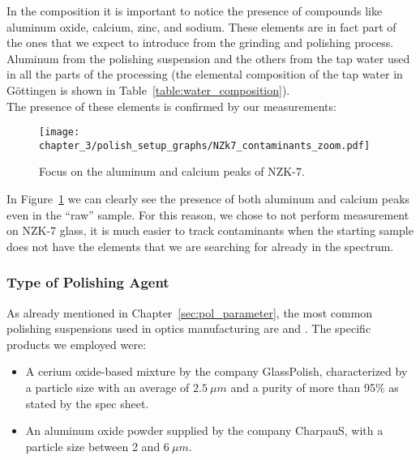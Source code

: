 In the composition it is important to notice the presence of compounds like aluminum oxide, calcium, zinc, and sodium. These elements are in fact part of the ones that we expect to introduce from the grinding and polishing process. Aluminum from the polishing suspension and the others from the tap water used in all the parts of the processing (the elemental composition of the tap water in Göttingen is shown in Table~\ref{table:water_composition}).
\\
The presence of these elements is confirmed by our measurements:
\begin{figure}[H]
    \centering
    \texttt{[image: chapter\_3/polish\_setup\_graphs/NZk7\_contaminants\_zoom.pdf]} 
    \vspace*{-30pt}
    \caption{Focus on the aluminum and calcium peaks of NZK-7.}
    \label{fig:nzk7_aluminum_calcium}
\end{figure}
In Figure~\ref{fig:nzk7_aluminum_calcium} we can clearly see the presence of both aluminum and calcium peaks even in the “raw” sample. For this reason, we chose to not perform measurement on NZK-7 glass, it is much easier to track contaminants when the starting sample does not have the elements that we are searching for already in the spectrum.

\subsubsection{Type of Polishing Agent}
\label{subsubsec:polish_type_conc}
As already mentioned in Chapter~\ref{sec:pol_parameter}, the most common polishing suspensions used in optics manufacturing are  and . 
The specific products we employed were:

\begin{itemize}
    \item A cerium oxide-based mixture by the company GlassPolish, characterized by a particle size with an average of $2.5\: \mu m$ and a purity of more than 95\% as stated by the spec sheet.
    \item An aluminum oxide powder supplied by the company CharpauS, with a particle size between 2 and $6 \: \mu m$.
\end{itemize}

